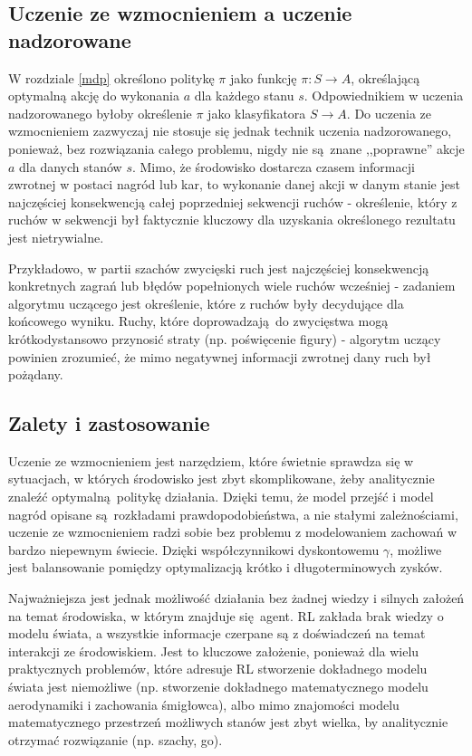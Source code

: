 \documentclass[polish,master,a4paper,oneside]{ppfcmthesis}
\begin{document}
\subsection{Uczenie ze wzmocnieniem a uczenie nadzorowane}
W rozdziale \ref{mdp} określono politykę $\pi$ jako funkcję $\pi: S \rightarrow A$, określającą optymalną akcję do wykonania $a$ dla każdego stanu $s$. Odpowiednikiem w uczenia nadzorowanego byłoby określenie $\pi$ jako klasyfikatora $S \rightarrow A$. Do uczenia ze wzmocnieniem zazwyczaj nie stosuje się jednak technik uczenia nadzorowanego, ponieważ, bez rozwiązania całego problemu, nigdy nie są znane ,,poprawne'' akcje $a$ dla danych stanów $s$. Mimo, że środowisko dostarcza czasem informacji zwrotnej w postaci nagród lub kar, to wykonanie danej akcji w danym stanie jest najczęściej konsekwencją całej poprzedniej sekwencji ruchów - określenie, który z ruchów w sekwencji był faktycznie kluczowy dla uzyskania określonego rezultatu jest nietrywialne.

Przykładowo, w partii szachów zwycięski ruch jest najczęściej konsekwencją konkretnych zagrań lub błędów popełnionych wiele ruchów wcześniej - zadaniem algorytmu uczącego jest określenie, które z ruchów były decydujące dla końcowego wyniku. Ruchy, które doprowadzają do zwycięstwa mogą krótkodystansowo przynosić straty (np. poświęcenie figury) - algorytm uczący powinien zrozumieć, że mimo negatywnej informacji zwrotnej dany ruch był pożądany.

\subsection{Zalety i zastosowanie}

Uczenie ze wzmocnieniem jest narzędziem, które świetnie sprawdza się w sytuacjach, w których środowisko jest zbyt skomplikowane, żeby analitycznie znaleźć optymalną politykę działania. Dzięki temu, że model przejść i model nagród opisane są rozkładami prawdopodobieństwa, a nie stałymi zależnościami, uczenie ze wzmocnieniem radzi sobie bez problemu z modelowaniem zachowań w bardzo niepewnym świecie. Dzięki współczynnikowi dyskontowemu $\gamma$, możliwe jest balansowanie pomiędzy optymalizacją krótko i długoterminowych zysków.

Najważniejsza jest jednak możliwość działania bez żadnej wiedzy i silnych założeń na temat środowiska, w którym znajduje się agent. RL zakłada brak wiedzy o modelu świata, a wszystkie informacje czerpane są z doświadczeń na temat interakcji ze środowiskiem. Jest to kluczowe założenie, ponieważ dla wielu praktycznych problemów, które adresuje RL stworzenie dokładnego modelu świata jest niemożliwe (np. stworzenie dokładnego matematycznego modelu aerodynamiki i zachowania śmigłowca), albo mimo znajomości modelu matematycznego przestrzeń możliwych stanów jest zbyt wielka, by analitycznie otrzymać rozwiązanie (np. szachy, go).
\end{document}
